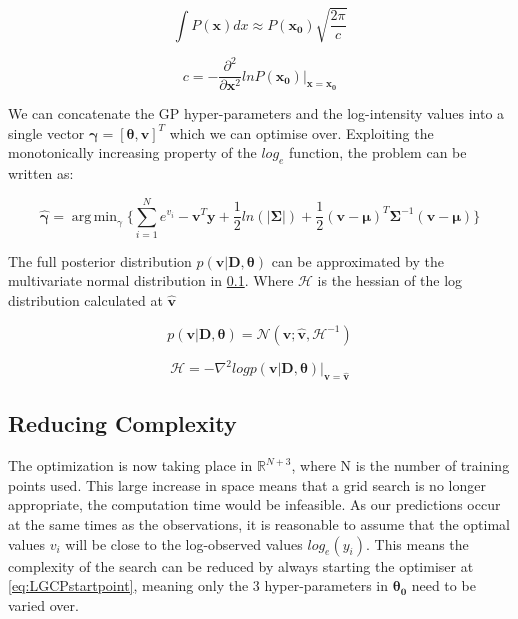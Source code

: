\documentclass[a4paper,11pt]{report}
\DeclareMathOperator*{\argmin}{arg\,min}
\begin{document}
\singlespacing

\begin{equation} \label{eq:laplaceaprrox}
\int{P(\mathbf{x}) dx} \approx P(\mathbf{x_0}) \sqrt{\frac{2\pi}{c}}
\end{equation} 

\begin{equation} \label{eq:laplaceaprrox2}
c = - \frac{\partial^2}{\partial \mathbf{x}^2} ln P(\mathbf{x_0}) |_{\mathbf{x}=\mathbf{x_0}}
\end{equation}

\doublespacing 

We can concatenate the GP hyper-parameters and the log-intensity values into a single vector \( \boldsymbol{\gamma} = [\boldsymbol{\theta}, \mathbf{v}]^{T}\) which we can optimise over. Exploiting the monotonically increasing property of the \(log_e\) function, the problem can be written as:

\begin{equation} \label{eq:GPfmin}
\hat{\boldsymbol{\gamma}} = \argmin_\gamma{\{ \sum_{i=1}^{N}e^{v_i} - \mathbf{v}^{T}\mathbf{y} + \frac{1}{2}ln(|\boldsymbol{\Sigma}|) + \frac{1}{2}(\mathbf{v}-\boldsymbol{\mu})^{T}\boldsymbol{\Sigma}^{-1}(\mathbf{v}-\boldsymbol{\mu})\}}
\end{equation}

The full posterior distribution \(p(\mathbf{v|D},\boldsymbol{\theta})\) can be approximated by the multivariate normal distribution in \ref{}. Where \(\boldsymbol{\mathcal{H}}\) is the hessian of the log distribution calculated at \(\hat{\mathbf{v}}\) 

\singlespacing
\begin{equation}
p(\mathbf{v|D},\boldsymbol{\theta}) = \mathcal{N} (\mathbf{v}; \hat{\mathbf{v}}, \boldsymbol{\mathcal{H}}^{-1})
\end{equation}

\begin{equation}
\boldsymbol{\mathcal{H}} = -\nabla^2 log p(\mathbf{v|D},\boldsymbol{\theta}) |_{\mathbf{v}=\hat{\mathbf{v}}}
\end{equation}
\doublespacing

\subsection{Reducing Complexity}

The optimization is now taking place in \(\mathds{R}^{N+3}\), where N is the number of training points used. This large increase in space means that a grid search is no longer appropriate, the computation time would be infeasible. As our predictions occur at the same times as the observations, it is reasonable to assume that the optimal values \(v_i\) will be close to the log-observed values \(log_e(y_i)\). This means the complexity of the search can be reduced by always starting the optimiser at \ref{eq:LGCPstartpoint}, meaning only the 3 hyper-parameters in \(\boldsymbol{\theta_0}\) need to be varied over. \par
\end{document}
